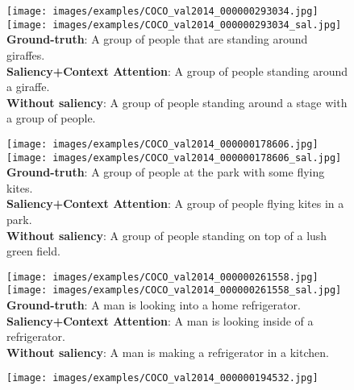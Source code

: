 \begin{figure}[t]
\begin{center}
    \begin{minipage}[t]{0.32\linewidth}
    \texttt{[image: images/examples/COCO\_val2014\_000000293034.jpg]}  
    \texttt{[image: images/examples/COCO\_val2014\_000000293034\_sal.jpg]}  
    \scriptsize{
        \textbf{Ground-truth}: A group of people that are standing around giraffes. \\
        \textbf{Saliency+Context Attention}: A group of people standing around a giraffe. \\
        \textbf{Without saliency}: A group of people standing around a stage with a group of people. \\
    }
    \end{minipage}
    \hspace{0.02cm}
    \begin{minipage}[t]{0.32\linewidth}
    \texttt{[image: images/examples/COCO\_val2014\_000000178606.jpg]}  
    \texttt{[image: images/examples/COCO\_val2014\_000000178606\_sal.jpg]}  
    \scriptsize{
        \textbf{Ground-truth}: A group of people at the park with some flying kites. \\
        \textbf{Saliency+Context Attention}: A group of people flying kites in a park. \\
        \textbf{Without saliency}: A group of people standing on top of a lush green field. \\
    }
    \end{minipage}
    \hspace{0.02cm}
    \begin{minipage}[t]{0.32\linewidth}
    \texttt{[image: images/examples/COCO\_val2014\_000000261558.jpg]} 
    \texttt{[image: images/examples/COCO\_val2014\_000000261558\_sal.jpg]}  
    \scriptsize{
        \textbf{Ground-truth}: A man is looking into a home refrigerator. \\
        \textbf{Saliency+Context Attention}: A man is looking inside of a refrigerator. \\
        \textbf{Without saliency}: A man is making a refrigerator in a kitchen. \\
    }
    \end{minipage}
    \begin{minipage}[t]{0.32\linewidth}
    \texttt{[image: images/examples/COCO\_val2014\_000000194532.jpg]} 

\end{minipage}
\end{center}
\end{figure}
